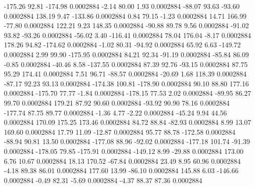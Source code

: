      -175.26       92.81     -174.98     0.0002884
       -2.14       80.00        1.93     0.0002884
      -88.07       93.63      -93.60     0.0002884
      138.19        9.47     -133.86     0.0002884
        0.84       79.15       -1.23     0.0002884
       14.71      166.99      -77.80     0.0002884
      122.21        9.23      148.35     0.0002884
      -90.88       89.78        9.56     0.0002884
      -91.02       93.82      -93.26     0.0002884
      -56.02        3.40     -116.41     0.0002884
       78.04      176.04       -8.17     0.0002884
      178.26       94.82     -174.62     0.0002884
       -1.02       80.31      -94.92     0.0002884
       65.92        6.63     -149.72     0.0002884
        2.99       99.90     -175.95     0.0002884
       84.21       92.34      -91.19     0.0002884
      -85.84       86.09       -0.85     0.0002884
      -40.46        8.58     -137.55     0.0002884
       87.39       92.76      -93.15     0.0002884
       87.75       95.29      174.41     0.0002884
        7.51       96.71      -88.57     0.0002884
      -20.69        1.68      118.39     0.0002884
      -87.17       92.23       93.13     0.0002884
     -174.38      100.81     -178.90     0.0002884
       90.10       88.80      177.16     0.0002884
     -175.70       77.77       -1.84     0.0002884
     -178.15       77.53        2.02     0.0002884
      -89.95       86.27       99.70     0.0002884
      179.21       87.92       90.60     0.0002884
      -93.92       90.90       78.16     0.0002884
     -177.74       87.75       89.77     0.0002884
       -1.36        4.77       -2.22     0.0002884
      -45.24        9.94       44.56     0.0002884
      170.09      175.25      173.46     0.0002884
       84.72       88.84      -82.93     0.0002884
        8.99       13.07      169.60     0.0002884
       17.79       11.09      -12.87     0.0002884
       95.77       88.78     -172.58     0.0002884
      -88.94       90.81       13.50     0.0002884
     -177.08       88.96      -92.02     0.0002884
     -177.18      101.74      -91.39     0.0002884
     -178.05       79.85     -175.91     0.0002884
     -149.12        8.99      -29.88     0.0002884
      173.00        6.76       10.67     0.0002884
       18.13      170.52      -67.84     0.0002884
       23.49        8.95       60.96     0.0002884
       -4.18       89.38       86.01     0.0002884
      177.60       13.99      -86.10     0.0002884
      145.88        6.03     -146.66     0.0002884
       -0.49       82.31       -5.69     0.0002884
       -4.37       88.37       87.36     0.0002884
